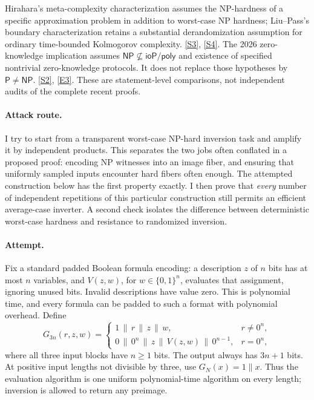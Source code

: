 \documentclass[11pt,a4paper]{article}
\newcommand{\sref}[2]{\hyperlink{source:#1:#2}{[S#2]}}
\newcommand{\eref}[2]{\hyperlink{extra:#1:#2}{[E#2]}}
\numberwithin{equation}{section}
\begin{document}
Hirahara's meta-complexity characterization assumes the NP-hardness of a
specific approximation problem in addition to worst-case NP hardness;
Liu--Pass's boundary characterization retains a substantial derandomization
assumption for ordinary time-bounded Kolmogorov complexity.
\sref{33}{3}, \sref{33}{4}. The 2026 zero-knowledge implication assumes
$\mathsf{NP}\not\subseteq\mathsf{ioP/poly}$ and existence of specified
nontrivial zero-knowledge protocols. It does not replace those hypotheses
by $\mathsf P\ne\mathsf{NP}$. \sref{33}{2}, \eref{33}{3}.
These are statement-level comparisons, not independent audits of the
complete recent proofs.

\paragraph{Attack route.}
I try to start from a transparent worst-case NP-hard inversion task and
amplify it by independent products. This separates the two jobs often
conflated in a proposed proof: encoding NP witnesses into an image fiber,
and ensuring that uniformly sampled inputs encounter hard fibers often
enough. The attempted construction below has the first property exactly.
I then prove that \emph{every} number of independent repetitions of this
particular construction still permits an efficient average-case inverter.
A second check isolates the difference between deterministic worst-case
hardness and resistance to randomized inversion.

\paragraph{Attempt.}
Fix a standard padded Boolean formula encoding: a description $z$ of $n$
bits has at most $n$ variables, and $V(z,w)$, for $w\in\{0,1\}^n$, evaluates
that assignment, ignoring unused bits. Invalid descriptions have value zero.
This is polynomial time, and every formula can be padded to such a format
with polynomial overhead. Define
\begin{equation}\label{r33:rare}
 G_{3n}(r,z,w)=
 \begin{cases}
  1\,\|\,r\,\|\,z\,\|\,w,&r\ne0^n,\\
  0\,\|\,0^n\,\|\,z\,\|\,V(z,w)\,\|\,0^{n-1},&r=0^n,
 \end{cases}
\end{equation}
where all three input blocks have $n\ge1$ bits. The output always has
$3n+1$ bits. At positive input lengths not divisible by three, use
$G_N(x)=1\|x$. Thus the evaluation algorithm is one uniform polynomial-time
algorithm on every length; inversion is allowed to return any preimage.
\end{document}
